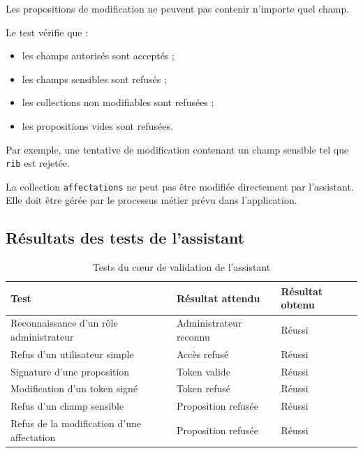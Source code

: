 \documentclass{rapportENSIAS}
\begin{document}
Les propositions de modification ne peuvent pas contenir n’importe quel champ.

Le test vérifie que :

\begin{itemize}
    \item les champs autorisés sont acceptés ;
    \item les champs sensibles sont refusés ;
    \item les collections non modifiables sont refusées ;
    \item les propositions vides sont refusées.
\end{itemize}

Par exemple, une tentative de modification contenant un champ sensible tel que \texttt{rib} est rejetée.

La collection \texttt{affectations} ne peut pas être modifiée directement par l’assistant. Elle doit être gérée par le processus métier prévu dans l’application.

\subsection{Résultats des tests de l’assistant}

\begin{table}[htbp]
    \centering
    \caption{Tests du cœur de validation de l’assistant}
    \label{tab:tests-assistant}
    \begin{tabular}{|p{7cm}|p{3cm}|p{3cm}|}
        \hline
        \textbf{Test} & \textbf{Résultat attendu} & \textbf{Résultat obtenu} \\
        \hline
        Reconnaissance d’un rôle administrateur & Administrateur reconnu & Réussi \\
        \hline
        Refus d’un utilisateur simple & Accès refusé & Réussi \\
        \hline
        Signature d’une proposition & Token valide & Réussi \\
        \hline
        Modification d’un token signé & Token refusé & Réussi \\
        \hline
        Refus d’un champ sensible & Proposition refusée & Réussi \\
        \hline
        Refus de la modification d’une affectation & Proposition refusée & Réussi \\
        \hline
    \end{tabular}
\end{table}
\end{document}
